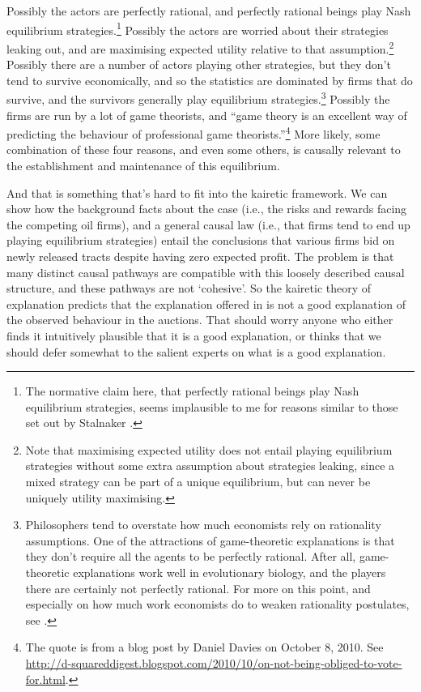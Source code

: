 Possibly the actors are perfectly rational, and perfectly rational beings play Nash equilibrium strategies.\footnote{The normative claim here, that perfectly rational beings play Nash equilibrium strategies, seems implausible to me for reasons similar to those set out by Stalnaker \citeyearpar{Stalnaker1996, Stalnaker1998, Stalnaker1999}.} Possibly the actors are worried about their strategies leaking out, and are maximising expected utility relative to that assumption.\footnote{Note that maximising expected utility does not entail playing equilibrium strategies without some extra assumption about strategies leaking, since a mixed strategy can be part of a unique equilibrium, but can never be uniquely utility maximising.} Possibly there are a number of actors playing other strategies, but they don't tend to survive economically, and so the statistics are dominated by firms that do survive, and the survivors generally play equilibrium strategies.\footnote{Philosophers tend to overstate how much economists rely on rationality assumptions. One of the attractions of game-theoretic explanations is that they don't require all the agents to be perfectly rational. After all, game-theoretic explanations work well in evolutionary biology, and the players there are certainly not perfectly rational. For more on this point, and especially on how much work economists do to weaken rationality postulates, see \citet{Hahn1996}.} Possibly the firms are run by a lot of game theorists, and ``game theory is an excellent way of predicting the behaviour of professional game theorists.''\footnote{The quote is from a blog post by Daniel Davies on October 8, 2010. See \url{http://d-squareddigest.blogspot.com/2010/10/on-not-being-obliged-to-vote-for.html}.} More likely, some combination of these four reasons, and even some others, is causally relevant to the establishment and maintenance of this equilibrium.

And that is something that's hard to fit into the kairetic framework. We can show how the background facts about the case (i.e., the risks and rewards facing the competing oil firms), and a general causal law (i.e., that firms tend to end up playing equilibrium strategies) entail the conclusions that various firms bid on newly released tracts despite having zero expected profit. The problem is that many distinct causal pathways are compatible with this loosely described causal structure, and these pathways are not `cohesive'. So the kairetic theory of explanation predicts that the explanation offered in \citet{HendricksPorter1988} is not a good explanation of the observed behaviour in the auctions. That should worry anyone who either finds it intuitively plausible that it is a good explanation, or thinks that we should defer somewhat to the salient experts on what is a good explanation.

